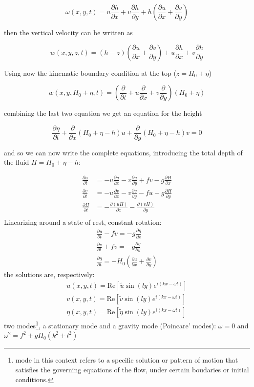\[\omega(x,y,t) = u\frac{\partial h}{\partial x} + v\frac{\partial h}{\partial y} + h \left(\frac{\partial u}{\partial x} + \frac{\partial v}{\partial y}\right)\]

then the vertical velocity can be written as

\[w(x,y,z,t) = (h-z)\left(\frac{\partial u}{\partial x} + \frac{\partial v}{\partial y}\right) + u\frac{\partial h}{\partial x} + v\frac{\partial h}{\partial y}\]

Using now the kinematic boundary condition at the top (\(z=H_0+\eta\))

\[w(x,y,H_0+\eta,t) = \left(\frac{\partial }{\partial t} + u\frac{\partial }{\partial x} + v\frac{\partial }{\partial y}\right)(H_0+\eta)\]

combining the last two equation we get an equation for the height

\[\frac{\partial \eta}{\partial t} + \frac{\partial }{\partial x}(H_0+\eta -h)u + \frac{\partial }{\partial y}(H_0+\eta -h)v = 0\]

and so we can now write the complete equations, introducing the total
depth of the fluid \(H=H_0+\eta -h\):

\[\begin{aligned}
		\frac{\partial u}{\partial t} & = -u \frac{\partial u}{\partial x} -v \frac{\partial u}{\partial y} + f v -g\frac{\partial H}{\partial x} \\
		\frac{\partial v}{\partial t} & = -u \frac{\partial v}{\partial x} -v \frac{\partial v}{\partial y} - f u -g\frac{\partial H}{\partial y} \\
		\frac{\partial H}{\partial t} & = - \frac{\partial (u H)}{\partial x} - \frac{\partial (v H)}{\partial y}                                 \\
	\end{aligned}\]
Linearizing around a state of rest, constant rotation:
\begin{align*}
	\frac{\partial u}{\partial t}-fv=-g\frac{\partial\eta}{\partial x} \\
	\frac{\partial v}{\partial t}+fv=-g\frac{\partial\eta}{\partial y} \\
	\frac{\partial\eta}{\partial t}=-H_0\left(\frac{\partial u}{\partial x}+\frac{\partial v}{\partial y}\right)
\end{align*}
the solutions are, respectively:
\begin{align*}
	u(x,y,t)=\text{Re}\left[\tilde{u}\sin(ly)e^{i(kx-\omega t)}\right] \\
	v(x,y,t)=\text{Re}\left[\tilde{v}\sin(ly)e^{i(kx-\omega t)}\right] \\
	\eta(x,y,t)=\text{Re}\left[\tilde{\eta}\sin(ly)e^{i(kx-\omega t)}\right]
\end{align*}
two modes\footnote{mode in this context refers to a specific solution or pattern of motion that satisfies the governing equations of the flow, under certain boudaries or initial conditions.}, a stationary mode and a gravity mode (Poincare' modes): $\omega=0$ and $\omega^2=f^2+gH_0(k^2+l^2)$


